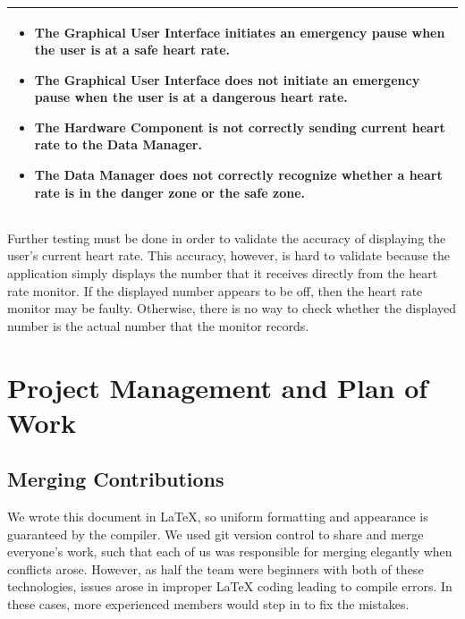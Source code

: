 \documentclass[letterpaper,english, 12pt]{scrreprt}
\begin{document}
\begin{center}
\begin{tabular}{|C{15cm}|}
                                \begin{itemize}
                                        \item The Graphical User Interface initiates an emergency pause when the user is at a safe heart rate.
					\item The Graphical User Interface does not initiate an emergency pause when the user is at a dangerous heart rate.
					\item The Hardware Component is not correctly sending current heart rate to the Data Manager.
					\item The Data Manager does not correctly recognize whether a heart rate is in the danger zone or the safe zone.
                                \end{itemize}\\
                \hline
        \end{tabular}
\end{center}
Further testing must be done in order to validate the accuracy of displaying the user's current heart rate. This accuracy, however, is hard to validate because the application simply displays the number that it receives directly from the heart rate monitor. If the displayed number appears to be off, then the heart rate monitor may be faulty. Otherwise, there is no way to check whether the displayed number is the actual number that the monitor records. 

\chapter{Project Management and Plan of Work}
\section{Merging Contributions}
We wrote this document in \LaTeX, so uniform formatting and appearance is guaranteed by the compiler.
We used git version control to share and merge everyone's work, such that each of us was responsible for merging elegantly when conflicts arose.
However, as half the team were beginners with both of these technologies, issues arose in improper LaTeX coding leading to compile errors.
In these cases, more experienced members would step in to fix the mistakes.
\end{document}
